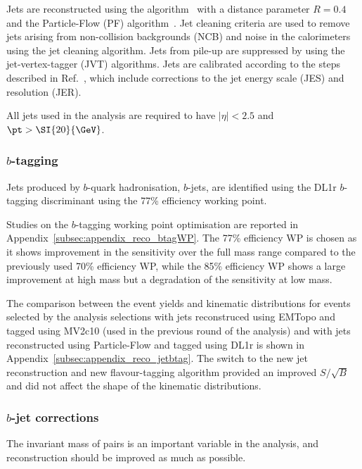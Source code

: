 Jets are reconstructed using the \antikt algorithm~\cite{Cacciari:2008gp} with a distance parameter $R=0.4$ and the Particle-Flow (PF) algorithm~\cite{Aaboud:2017aca}.
Jet cleaning criteria are used to remove jets arising from non-collision backgrounds (NCB) and noise in the calorimeters using the jet cleaning algorithm. Jets from pile-up are suppressed by using the jet-vertex-tagger (JVT) algorithms.
Jets are calibrated according to the steps described in Ref.~\cite{Aaboud:2017aca}, which include corrections to the jet energy scale (JES) and resolution (JER).

All jets used in the analysis are required to have $|\eta|<2.5$ and $\pt>\SI{20}{\GeV}$.

\subsubsection{$b$-tagging}

Jets produced by $b$-quark hadronisation, $b$-jets, are identified using the DL1r $b$-tagging discriminant using the 77\% efficiency working point. 

Studies on the $b$-tagging working point optimisation are reported in Appendix~\ref{subsec:appendix_reco_btagWP}. The 77\% efficiency WP is chosen as it shows improvement in the sensitivity over the full mass range compared to the previously used 70\% efficiency WP, while the 85\% efficiency WP shows a large improvement at high mass but a degradation of the sensitivity at low mass.

The comparison between the event yields and kinematic distributions for events selected by the analysis selections with jets reconstruced using EMTopo and tagged using MV2c10 (used in the previous round of the analysis) and with jets reconstructed using Particle-Flow and tagged using DL1r is shown in Appendix~\ref{subsec:appendix_reco_jetbtag}. The switch to the new jet reconstruction and new flavour-tagging algorithm provided an improved $S/\sqrt{B}$ and did not affect the shape of the kinematic distributions.

\subsubsection{$b$-jet corrections}
The invariant mass of \bjet pairs is an important variable in the analysis, and \mbb reconstruction should be improved as much as possible.

